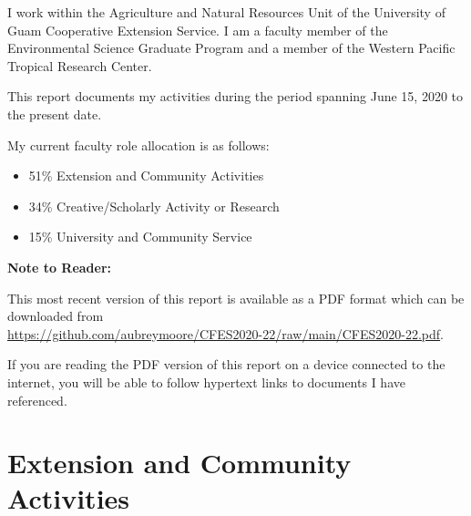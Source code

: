 I work within the Agriculture and Natural Resources Unit of the University
of Guam Cooperative Extension Service. I am a faculty member of the
Environmental Science Graduate Program and a member of the Western
Pacific Tropical Research Center. 

This report documents my activities during the period spanning June 15, 2020 to the present date.

My current faculty role allocation is as follows:
\begin{itemize}
	\item 51\% Extension and Community Activities 
	\item 34\% Creative/Scholarly Activity or Research 
	\item 15\% University and Community Service
\end{itemize}

\textbf{Note to Reader:}

This most recent version of this report is available as a PDF format which can be downloaded from \\
\url{https://github.com/aubreymoore/CFES2020-22/raw/main/CFES2020-22.pdf}. 

If you are reading the PDF version of this report on a device connected
to the internet, you will be able to follow hypertext links to documents
I have referenced.

\pagebreak

\section{Extension and Community Activities}

